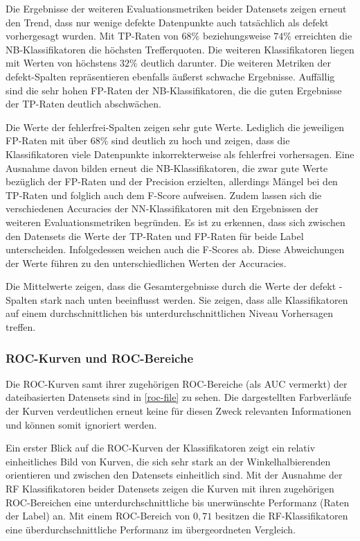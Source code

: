 Die Ergebnisse der weiteren Evaluationsmetriken beider Datensets zeigen erneut den Trend, dass nur wenige defekte Datenpunkte auch tatsächlich als defekt vorhergesagt wurden. Mit TP-Raten von $68\%$ beziehungsweise $74\%$ erreichten die NB-Klassifikatoren die höchsten Trefferquoten. Die weiteren Klassifikatoren liegen mit Werten von höchstens $32\%$ deutlich darunter. Die weiteren Metriken der \glqq defekt\grqq -Spalten repräsentieren ebenfalls äußerst schwache Ergebnisse. Auffällig sind die sehr hohen FP-Raten der NB-Klassifikatoren, die die guten Ergebnisse der TP-Raten deutlich abschwächen.

Die Werte der \glqq fehlerfrei\grqq -Spalten zeigen sehr gute Werte. Lediglich die jeweiligen FP-Raten mit über $68\%$ sind deutlich zu hoch und zeigen, dass die Klassifikatoren viele Datenpunkte inkorrekterweise als \glqq fehlerfrei\grqq{} vorhersagen. Eine Ausnahme davon bilden erneut die NB-Klassifikatoren, die zwar gute Werte bezüglich der FP-Raten und der Precision erzielten, allerdings Mängel bei den TP-Raten und folglich auch dem F-Score aufweisen. Zudem lassen sich die verschiedenen Accuracies der NN-Klassifikatoren mit den Ergebnissen der weiteren Evaluationsmetriken begründen. Es ist zu erkennen, dass sich zwischen den Datensets die Werte der TP-Raten und FP-Raten für beide Label unterscheiden. Infolgedessen weichen auch die F-Scores ab. Diese Abweichungen der Werte führen zu den unterschiedlichen Werten der Accuracies.

Die Mittelwerte zeigen, dass die Gesamtergebnisse durch die Werte der \glqq defekt\grqq{} -Spalten stark nach unten beeinflusst werden. Sie zeigen, dass alle Klassifikatoren auf einem durchschnittlichen bis unterdurchschnittlichen Niveau Vorhersagen treffen.

\subsubsection*{ROC-Kurven und ROC-Bereiche}

Die ROC-Kurven samt ihrer zugehörigen ROC-Bereiche (als \glqq AUC\grqq{} vermerkt) der dateibasierten Datensets sind in \autoref{roc-file} zu sehen. Die dargestellten Farbverläufe der Kurven verdeutlichen erneut keine für diesen Zweck relevanten Informationen und können somit ignoriert werden.

Ein erster Blick auf die ROC-Kurven der Klassifikatoren zeigt ein relativ einheitliches Bild von Kurven, die sich sehr stark an der Winkelhalbierenden orientieren und zwischen den Datensets einheitlich sind. Mit der Ausnahme der RF Klassifikatoren beider Datensets zeigen die Kurven mit ihren zugehörigen ROC-Bereichen eine unterdurchschnittliche bis unerwünschte Performanz (\glqq Raten\grqq{} der Label) an. Mit einem ROC-Bereich von $0,71$ besitzen die RF-Klassifikatoren eine überdurchschnittliche Performanz im übergeordneten Vergleich.

